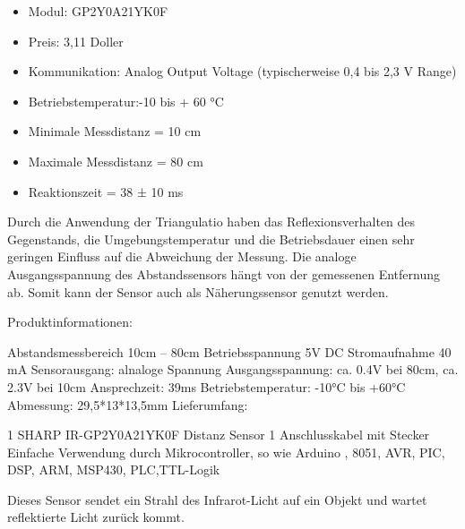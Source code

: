 \begin{itemize}
\item Modul: GP2Y0A21YK0F
\item Preis: 3,11 Doller
\item Kommunikation: Analog Output Voltage (typischerweise 0,4 bis 2,3 V Range)
\item Betriebstemperatur:-10 bis + 60 °C
\item Minimale Messdistanz = 10 cm
\item Maximale Messdistanz = 80 cm
\item Reaktionszeit = 38 ± 10 ms
\end{itemize}


Durch die Anwendung der Triangulatio haben das Reflexionsverhalten des Gegenstands, die Umgebungstemperatur und die Betriebsdauer einen sehr geringen Einfluss auf die Abweichung der Messung. Die analoge Ausgangsspannung des Abstandssensors hängt von der gemessenen Entfernung ab. Somit kann der Sensor auch als Näherungssensor genutzt werden.

Produktinformationen:

Abstandsmessbereich 10cm – 80cm
Betriebsspannung 5V DC
Stromaufnahme 40 mA
Sensorausgang: alnaloge Spannung
Ausgangsspannung: ca. 0.4V bei 80cm, ca. 2.3V bei 10cm
Ansprechzeit: 39ms
Betriebstemperatur: -10°C bis +60°C
Abmessung: 29,5*13*13,5mm
Lieferumfang:

1 SHARP IR-GP2Y0A21YK0F Distanz Sensor
1 Anschlusskabel mit Stecker
Einfache Verwendung durch Mikrocontroller, so wie Arduino , 8051, AVR, PIC, DSP, ARM, MSP430, PLC,TTL-Logik


Dieses Sensor sendet ein Strahl des Infrarot-Licht auf ein Objekt und wartet  reflektierte Licht zurück kommt.